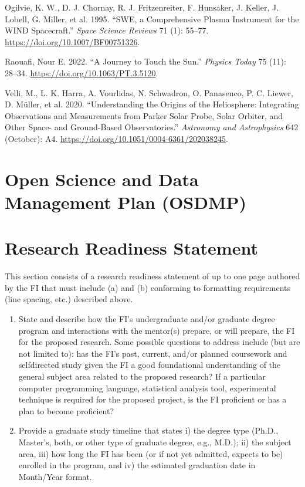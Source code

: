 \documentclass[
  letterpaper,
  DIV=11,
  numbers=noendperiod,
  oneside]{scrartcl}
\providecommand{\tightlist}{%
  \setlength{\itemsep}{0pt}\setlength{\parskip}{0pt}}\usepackage{longtable,booktabs,array}
\newlength{\cslhangindent}
\newenvironment{CSLReferences}[2] %
 {\begin{list}{}{%
  \setlength{\itemindent}{0pt}
  \setlength{\leftmargin}{0pt}
  \setlength{\parsep}{0pt}
  \ifodd #1
   \setlength{\leftmargin}{\cslhangindent}
   \setlength{\itemindent}{-1\cslhangindent}
  \fi
  \setlength{\itemsep}{#2\baselineskip}}}
 {\end{list}}
\begin{document}
\begin{CSLReferences}{1}{0}
Ogilvie, K. W., D. J. Chornay, R. J. Fritzenreiter, F. Hunsaker, J.
Keller, J. Lobell, G. Miller, et al. 1995. {``SWE, a Comprehensive
Plasma Instrument for the WIND Spacecraft.''} \emph{Space Science
Reviews} 71 (1): 55--77. \url{https://doi.org/10.1007/BF00751326}.

Raouafi, Nour E. 2022. {``A Journey to Touch the Sun.''} \emph{Physics
Today} 75 (11): 28--34. \url{https://doi.org/10.1063/PT.3.5120}.

Velli, M., L. K. Harra, A. Vourlidas, N. Schwadron, O. Panasenco, P. C.
Liewer, D. Müller, et al. 2020. {``Understanding the Origins of the
Heliosphere: Integrating Observations and Measurements from Parker Solar
Probe, Solar Orbiter, and Other Space- and Ground-Based
Observatories.''} \emph{Astronomy and Astrophysics} 642 (October): A4.
\url{https://doi.org/10.1051/0004-6361/202038245}.

\end{CSLReferences}

\newpage{}

\section{Open Science and Data Management Plan
(OSDMP)}\label{open-science-and-data-management-plan-osdmp}

\section{Research Readiness
Statement}\label{research-readiness-statement}

This section consists of a research readiness statement of up to one
page authored by the FI that must include (a) and (b) conforming to
formatting requirements (line spacing, etc.) described above.

\begin{enumerate}
\def\labelenumi{\alph{enumi}.}
\tightlist
\item
  State and describe how the FI's undergraduate and/or graduate degree
  program and interactions with the mentor(s) prepare, or will prepare,
  the FI for the proposed research. Some possible questions to address
  include (but are not limited to): has the FI's past, current, and/or
  planned coursework and selfdirected study given the FI a good
  foundational understanding of the general subject area related to the
  proposed research? If a particular computer programming language,
  statistical analysis tool, experimental technique is required for the
  proposed project, is the FI proficient or has a plan to become
  proficient?
\item
  Provide a graduate study timeline that states i) the degree type
  (Ph.D., Master's, both, or other type of graduate degree, e.g., M.D.);
  ii) the subject area, iii) how long the FI has been (or if not yet
  admitted, expects to be) enrolled in the program, and iv) the
  estimated graduation date in Month/Year format.
\end{enumerate}
\end{document}
